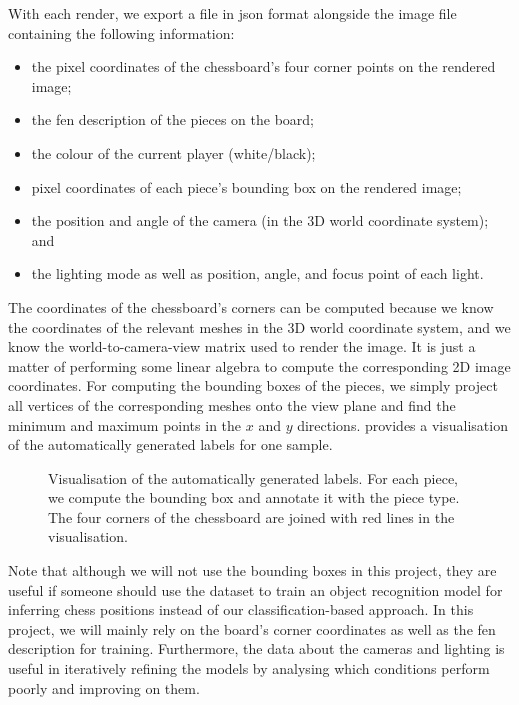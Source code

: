 \documentclass[../main.tex]{subfiles}
\begin{document}
With each render, we export a file in \gls{json} format alongside the image file containing the following information:
\begin{itemize}
    \item the pixel coordinates of the chessboard's four corner points on the rendered image;
    \item the \gls{fen} description of the pieces on the board;
    \item the colour of the current player (white/black);
    \item pixel coordinates of each piece's bounding box on the rendered image;
    \item the position and angle of the camera (in the 3D world coordinate system); and
    \item the lighting mode as well as position, angle, and focus point of each light.
\end{itemize}
The coordinates of the chessboard's corners can be computed because we know the coordinates of the relevant meshes in the 3D world coordinate system, and we know the world-to-camera-view matrix used to render the image.
It is just a matter of performing some linear algebra to compute the corresponding 2D image coordinates.
For computing the bounding boxes of the pieces, we simply project all vertices of the corresponding meshes onto the view plane and find the minimum and maximum points in the $x$ and $y$ directions.
 provides a visualisation of the automatically generated labels for one sample.
\begin{figure}
    \caption[Visualisation of the automatically generated labels.]{Visualisation of the automatically generated labels. For each piece, we compute the bounding box and annotate it with the piece type. The four corners of the chessboard are joined with red lines in the visualisation.}
    \label{fig:data_synthesis_visualisation}
\end{figure}
Note that although we will not use the bounding boxes in this project, they are useful if someone should use the dataset to train an object recognition model for inferring chess positions instead of our classification-based approach.
In this project, we will mainly rely on the board's corner coordinates as well as the \gls{fen} description for training.
Furthermore, the data about the cameras and lighting is useful in iteratively refining the models by analysing which conditions perform poorly and improving on them.
\end{document}
